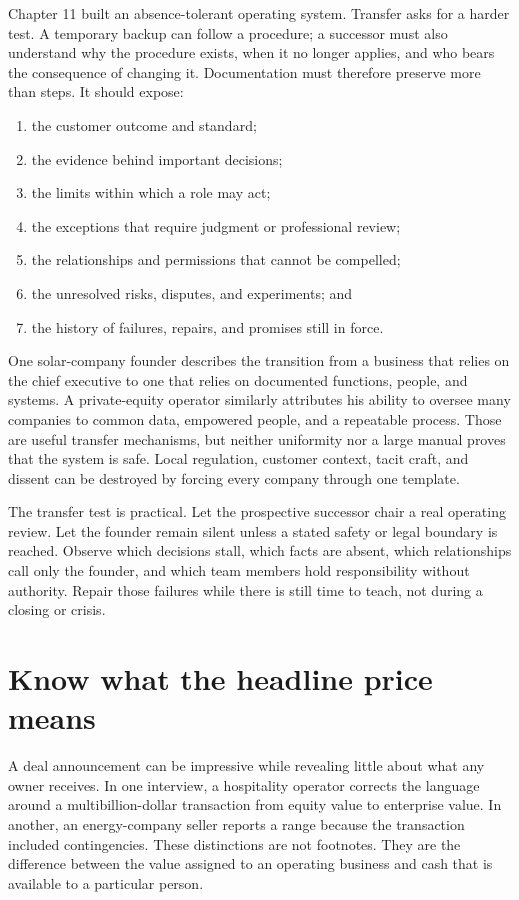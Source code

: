 Chapter 11 built an absence-tolerant operating system. Transfer asks for a
harder test. A temporary backup can follow a procedure; a successor must also
understand why the procedure exists, when it no longer applies, and who bears
the consequence of changing it. Documentation must therefore preserve more
than steps. It should expose:

\begin{enumerate}[itemsep=0.12em]
\item the customer outcome and standard;
\item the evidence behind important decisions;
\item the limits within which a role may act;
\item the exceptions that require judgment or professional review;
\item the relationships and permissions that cannot be compelled;
\item the unresolved risks, disputes, and experiments; and
\item the history of failures, repairs, and promises still in force.
\end{enumerate}

One solar-company founder describes the transition from a business that relies
on the chief executive to one that relies on documented functions, people, and
systems. A private-equity operator similarly attributes his ability to oversee
many companies to common data, empowered people, and a repeatable process.
Those are useful transfer mechanisms, but neither uniformity nor a large manual
proves that the system is safe. Local regulation, customer context, tacit craft,
and dissent can be destroyed by forcing every company through one template.

The transfer test is practical. Let the prospective successor chair a real
operating review. Let the founder remain silent unless a stated safety or legal
boundary is reached. Observe which decisions stall, which facts are absent,
which relationships call only the founder, and which team members hold
responsibility without authority. Repair those failures while there is still
time to teach, not during a closing or crisis.

\section{Know what the headline price means}

A deal announcement can be impressive while revealing little about what any
owner receives. In one interview, a hospitality operator corrects the language
around a multibillion-dollar transaction from equity value to enterprise value.
In another, an energy-company seller reports a range because the transaction
included contingencies. These distinctions are not footnotes. They are the
difference between the value assigned to an operating business and cash that is
available to a particular person.

